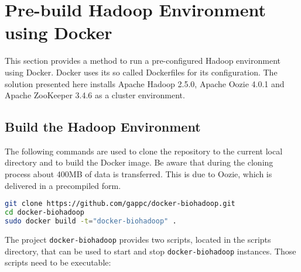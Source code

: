 % 
% 
% 

\section{Pre-build Hadoop Environment using Docker}
\label{chap:appendix:biohadoop-docker}
This section provides a method to run a pre-configured Hadoop environment using Docker. Docker uses its so called Dockerfiles for its configuration. The solution presented here installs Apache Hadoop 2.5.0, Apache Oozie 4.0.1 and Apache ZooKeeper 3.4.6 as a cluster environment.

\subsection{Build the Hadoop Environment}
The following commands are used to clone the repository to the current local directory and to build the Docker image. Be aware that during the cloning process about 400MB of data is transferred. This is due to Oozie, which is delivered in a precompiled form.
\begin{lstlisting}[language=bash]
git clone https://github.com/gappc/docker-biohadoop.git
cd docker-biohadoop
sudo docker build -t="docker-biohadoop" .
\end{lstlisting}

The project \texttt{docker-biohadoop} provides two scripts, located in the scripts directory, that can be used to start and stop \texttt{docker-biohadoop} instances. Those scripts need to be executable:

